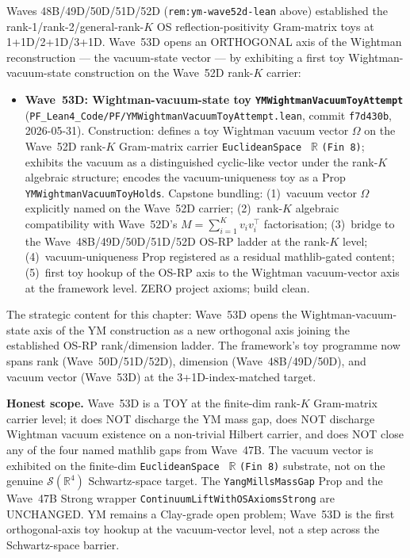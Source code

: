 \begin{remark}\label{rem:ym-wave53d-lean}
Waves 48B/49D/50D/51D/52D (\texttt{rem:ym-wave52d-lean} above) established the rank-1/rank-2/general-rank-$K$ OS reflection-positivity Gram-matrix toys at 1+1D/2+1D/3+1D. Wave~53D opens an ORTHOGONAL axis of the Wightman reconstruction --- the vacuum-state vector --- by exhibiting a first toy Wightman-vacuum-state construction on the Wave~52D rank-$K$ carrier:
\begin{itemize}
  \item \textbf{Wave~53D: Wightman-vacuum-state toy \texttt{YMWightmanVacuumToyAttempt}} (\texttt{PF\_Lean4\_Code/PF/YMWightmanVacuumToyAttempt.lean}, commit \texttt{f7d430b}, 2026-05-31). Construction: defines a toy Wightman vacuum vector $\Omega$ on the Wave~52D rank-$K$ Gram-matrix carrier \texttt{EuclideanSpace } $\mathbb{R}$ \texttt{(Fin 8)}; exhibits the vacuum as a distinguished cyclic-like vector under the rank-$K$ algebraic structure; encodes the vacuum-uniqueness toy as a Prop \texttt{YMWightmanVacuumToyHolds}. Capstone bundling: (1)~vacuum vector $\Omega$ explicitly named on the Wave~52D carrier; (2)~rank-$K$ algebraic compatibility with Wave~52D's $M = \sum_{i=1}^K v_i v_i^\top$ factorisation; (3)~bridge to the Wave~48B/49D/50D/51D/52D OS-RP ladder at the rank-$K$ level; (4)~vacuum-uniqueness Prop registered as a residual mathlib-gated content; (5)~first toy hookup of the OS-RP axis to the Wightman vacuum-vector axis at the framework level. ZERO project axioms; build clean.
\end{itemize}
The strategic content for this chapter: Wave~53D opens the Wightman-vacuum-state axis of the YM construction as a new orthogonal axis joining the established OS-RP rank/dimension ladder. The framework's toy programme now spans rank (Wave~50D/51D/52D), dimension (Wave~48B/49D/50D), and vacuum vector (Wave~53D) at the 3+1D-index-matched target.

\textbf{Honest scope.} Wave~53D is a TOY at the finite-dim rank-$K$ Gram-matrix carrier level; it does NOT discharge the YM mass gap, does NOT discharge Wightman vacuum existence on a non-trivial Hilbert carrier, and does NOT close any of the four named mathlib gaps from Wave~47B. The vacuum vector is exhibited on the finite-dim \texttt{EuclideanSpace } $\mathbb{R}$ \texttt{(Fin 8)} substrate, not on the genuine $\mathcal{S}(\mathbb{R}^4)$ Schwartz-space target. The \texttt{YangMillsMassGap} Prop and the Wave~47B Strong wrapper \texttt{ContinuumLiftWithOSAxiomsStrong} are UNCHANGED. YM remains a Clay-grade open problem; Wave~53D is the first orthogonal-axis toy hookup at the vacuum-vector level, not a step across the Schwartz-space barrier.
\end{remark}

